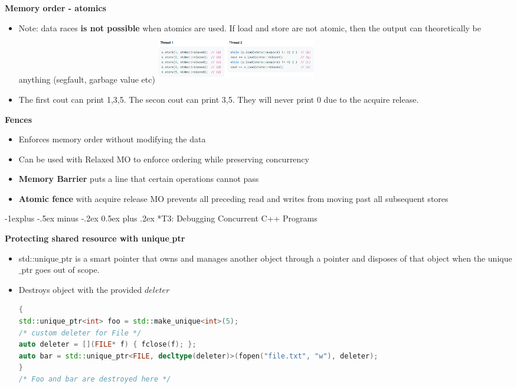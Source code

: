\documentclass[10pt, landscape]{article}
\makeatletter
\renewcommand{\subsection}{\@startsection{subsection}{2}{0mm}%
                                {-1explus -.5ex minus -.2ex}%
                                {0.5ex plus .2ex}%
                                {\normalfont\normalsize\bfseries}}
\makeatother
\begin{document}
\begin{multicols}{4}
\textbf{Memory order - atomics} \\
\begin{itemize}
    \item Note: data races \textbf{is not possible} when atomics are used. If load and store are not atomic, then the output can theoretically be anything (segfault, garbage value etc)
    \includegraphics*[width=7cm,height=2.2cm]{t2_1.png}
    \item The first cout can print 1,3,5. The secon cout can print 3,5. They will never print 0 due to the acquire release.
\end{itemize}

\textbf{Fences} \\
\begin{itemize}
    \item Enforces memory order without modifying the data 
    \item Can be used with Relaxed MO to enforce ordering while preserving concurrency 
    \item \textbf{Memory Barrier} puts a line that certain operations cannot pass 
    \item \textbf{Atomic fence} with acquire release MO prevents all preceding read and writes from moving past all subsequent stores
\end{itemize}

\subsection*{T3: Debugging Concurrent C++ Programs}

\textbf{Protecting shared resource with unique$\_$ptr} \\
\begin{itemize}
    \item std::unique$\_$ptr is a smart pointer that owns and manages another object through a pointer and disposes of that object when the unique$\_$ptr goes out of scope.
    \item Destroys object with the provided $deleter$
    \begin{lstlisting}[language=C++, breaklines=true, breakatwhitespace=true]
{ 
std::unique_ptr<int> foo = std::make_unique<int>(5);
/* custom deleter for File */
auto deleter = [](FILE* f) { fclose(f); };
auto bar = std::unique_ptr<FILE, decltype(deleter)>(fopen("file.txt", "w"), deleter);
}
/* Foo and bar are destroyed here */
    \end{lstlisting}
\end{itemize}


\end{multicols}
\end{document}
